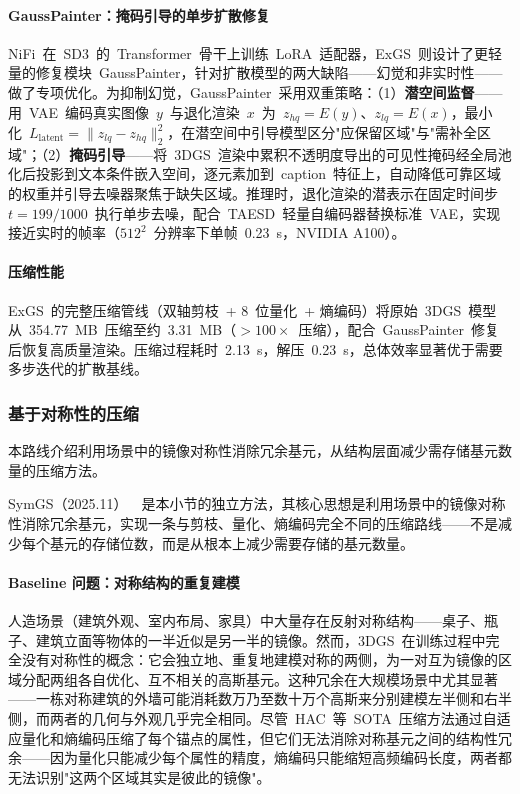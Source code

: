 \paragraph{GaussPainter：掩码引导的单步扩散修复}

NiFi~在~SD3~的~Transformer~骨干上训练~LoRA~适配器，ExGS~则设计了更轻量的修复模块~GaussPainter，针对扩散模型的两大缺陷——幻觉和非实时性——做了专项优化。为抑制幻觉，GaussPainter~采用双重策略：（1）\textbf{潜空间监督}——用~VAE~编码真实图像~$y$~与退化渲染~$x$~为~$z_{hq}=E(y)$、$z_{lq}=E(x)$，最小化~$L_\text{latent}=\|z_{lq}-z_{hq}\|_2^2$，在潜空间中引导模型区分"应保留区域"与"需补全区域"；（2）\textbf{掩码引导}——将~3DGS~渲染中累积不透明度导出的可见性掩码经全局池化后投影到文本条件嵌入空间，逐元素加到~caption~特征上，自动降低可靠区域的权重并引导去噪器聚焦于缺失区域。推理时，退化渲染的潜表示在固定时间步~$t=199/1000$~执行单步去噪，配合~TAESD~轻量自编码器替换标准~VAE，实现接近实时的帧率（$512^2$~分辨率下单帧~0.23~s，NVIDIA A100）。

\paragraph{压缩性能}

ExGS~的完整压缩管线（双轴剪枝~+ 8~位量化~+ 熵编码）将原始~3DGS~模型从~354.77~MB~压缩至约~3.31~MB（$>100\times$~压缩），配合~GaussPainter~修复后恢复高质量渲染。压缩过程耗时~2.13~s，解压~0.23~s，总体效率显著优于需要多步迭代的扩散基线。

\subsubsection{基于对称性的压缩}

本路线介绍利用场景中的镜像对称性消除冗余基元，从结构层面减少需存储基元数量的压缩方法。

SymGS（2025.11）~\cite{2511_13264}~是本小节的独立方法，其核心思想是利用场景中的镜像对称性消除冗余基元，实现一条与剪枝、量化、熵编码完全不同的压缩路线——不是减少每个基元的存储位数，而是从根本上减少需要存储的基元数量。

\paragraph{Baseline 问题：对称结构的重复建模}

人造场景（建筑外观、室内布局、家具）中大量存在反射对称结构——桌子、瓶子、建筑立面等物体的一半近似是另一半的镜像。然而，3DGS~在训练过程中完全没有对称性的概念：它会独立地、重复地建模对称的两侧，为一对互为镜像的区域分配两组各自优化、互不相关的高斯基元。这种冗余在大规模场景中尤其显著——一栋对称建筑的外墙可能消耗数万乃至数十万个高斯来分别建模左半侧和右半侧，而两者的几何与外观几乎完全相同。尽管~HAC~等~SOTA~压缩方法通过自适应量化和熵编码压缩了每个锚点的属性，但它们无法消除对称基元之间的结构性冗余——因为量化只能减少每个属性的精度，熵编码只能缩短高频编码长度，两者都无法识别"这两个区域其实是彼此的镜像"。

